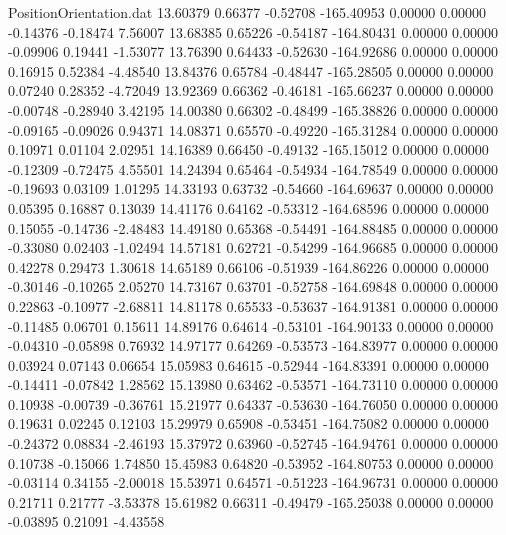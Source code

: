 \begin{filecontents}{PositionOrientation.dat}
  13.60379    0.66377   -0.52708  -165.40953    0.00000    0.00000   -0.14376   -0.18474    7.56007
  13.68385    0.65226   -0.54187  -164.80431    0.00000    0.00000   -0.09906    0.19441   -1.53077
  13.76390    0.64433   -0.52630  -164.92686    0.00000    0.00000    0.16915    0.52384   -4.48540
  13.84376    0.65784   -0.48447  -165.28505    0.00000    0.00000    0.07240    0.28352   -4.72049
  13.92369    0.66362   -0.46181  -165.66237    0.00000    0.00000   -0.00748   -0.28940    3.42195
  14.00380    0.66302   -0.48499  -165.38826    0.00000    0.00000   -0.09165   -0.09026    0.94371
  14.08371    0.65570   -0.49220  -165.31284    0.00000    0.00000    0.10971    0.01104    2.02951
  14.16389    0.66450   -0.49132  -165.15012    0.00000    0.00000   -0.12309   -0.72475    4.55501
  14.24394    0.65464   -0.54934  -164.78549    0.00000    0.00000   -0.19693    0.03109    1.01295
  14.33193    0.63732   -0.54660  -164.69637    0.00000    0.00000    0.05395    0.16887    0.13039
  14.41176    0.64162   -0.53312  -164.68596    0.00000    0.00000    0.15055   -0.14736   -2.48483
  14.49180    0.65368   -0.54491  -164.88485    0.00000    0.00000   -0.33080    0.02403   -1.02494
  14.57181    0.62721   -0.54299  -164.96685    0.00000    0.00000    0.42278    0.29473    1.30618
  14.65189    0.66106   -0.51939  -164.86226    0.00000    0.00000   -0.30146   -0.10265    2.05270
  14.73167    0.63701   -0.52758  -164.69848    0.00000    0.00000    0.22863   -0.10977   -2.68811
  14.81178    0.65533   -0.53637  -164.91381    0.00000    0.00000   -0.11485    0.06701    0.15611
  14.89176    0.64614   -0.53101  -164.90133    0.00000    0.00000   -0.04310   -0.05898    0.76932
  14.97177    0.64269   -0.53573  -164.83977    0.00000    0.00000    0.03924    0.07143    0.06654
  15.05983    0.64615   -0.52944  -164.83391    0.00000    0.00000   -0.14411   -0.07842    1.28562
  15.13980    0.63462   -0.53571  -164.73110    0.00000    0.00000    0.10938   -0.00739   -0.36761
  15.21977    0.64337   -0.53630  -164.76050    0.00000    0.00000    0.19631    0.02245    0.12103
  15.29979    0.65908   -0.53451  -164.75082    0.00000    0.00000   -0.24372    0.08834   -2.46193
  15.37972    0.63960   -0.52745  -164.94761    0.00000    0.00000    0.10738   -0.15066    1.74850
  15.45983    0.64820   -0.53952  -164.80753    0.00000    0.00000   -0.03114    0.34155   -2.00018
  15.53971    0.64571   -0.51223  -164.96731    0.00000    0.00000    0.21711    0.21777   -3.53378
  15.61982    0.66311   -0.49479  -165.25038    0.00000    0.00000   -0.03895    0.21091   -4.43558

\end{filecontents}
